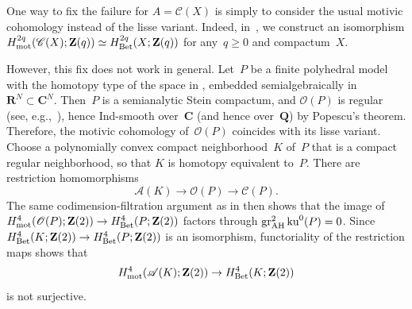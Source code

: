 \documentclass[11pt,a4paper]{amsart}
\newcommand{\cref}[1]{\zcref{#1}}
\numberwithin{equation}{section}
\theoremstyle{plain}
\theoremstyle{definition}
\theoremstyle{remark}
\newcommand{\ZZ}{\mathbf{Z}}
\newcommand{\QQ}{\mathbf{Q}}
\newcommand{\CC}{\mathbf{C}}
\newcommand{\RR}{\mathbf{R}}
\newcommand{\AH}{\textnormal{AH}}
\newcommand{\mot}{\textnormal{mot}}
\newcommand{\Bet}{\textnormal{Bet}}
\newcommand{\gr}{\operatorname{gr}}
\newcommand{\ku}{\operatorname{ku}}
\newcommand{\Cls}[1]{\mathscr{#1}}
\begin{document}
\begin{remark}\label{xvmuzo}
  One way to fix the failure for \(A=\Cls{C}(X)\)
  is simply to consider the usual motivic cohomology
  instead of the lisse variant.
  Indeed, in~\cite{mot-cx},
  we construct
  an isomorphism
  \(H_{\mot}^{2q}(\Cls{C}(X);\ZZ(q))\simeq H_{\Bet}^{2q}(X;\ZZ(q))\)
  for any~\(q\geq0\) and compactum~\(X\).

  However, this fix does not work in general.
  Let~\(P\) be a finite polyhedral model
  with the homotopy type of the space in \cref{counterexample},
  embedded semialgebraically in \(\RR^N\subset\CC^N\).
  Then~\(P\) is a semianalytic Stein compactum,
  and \(\Cls{O}(P)\) is regular
  (see, e.g.,~\cite[Theorem~6.6]{k-ros-3}), hence Ind-smooth over~\(\CC\)
  (and hence over~\(\QQ\))
  by Popescu’s theorem.
  Therefore, the motivic cohomology of~\(\Cls{O}(P)\)
  coincides with its lisse variant.
  Choose a polynomially convex compact neighborhood~\(K\) of~\(P\)
  that is a compact regular neighborhood,
  so that \(K\) is homotopy equivalent to~\(P\).
  There are restriction homomorphisms
  \begin{equation*}
    \Cls{A}(K)\to\Cls{O}(P)\to\Cls{C}(P).
  \end{equation*}
  The same codimension-filtration argument
  as in \cref{xxjrs2} then shows that the
  image of
  \(
    H^4_{\mot}(\Cls{O}(P);\ZZ(2))\to H^4_{\Bet}(P;\ZZ(2))
  \)
  factors through \(\gr^2_{\AH}\ku^0(P)=0\).
  Since \(H^4_{\Bet}(K;\ZZ(2))\to H^4_{\Bet}(P;\ZZ(2))\) is an isomorphism,
  functoriality of the restriction maps shows that
  \begin{equation*}
    H^4_{\mot}(\Cls{A}(K);\ZZ(2))\to H^4_{\Bet}(K;\ZZ(2))
  \end{equation*}
  is not surjective.
\end{remark}
\end{document}

